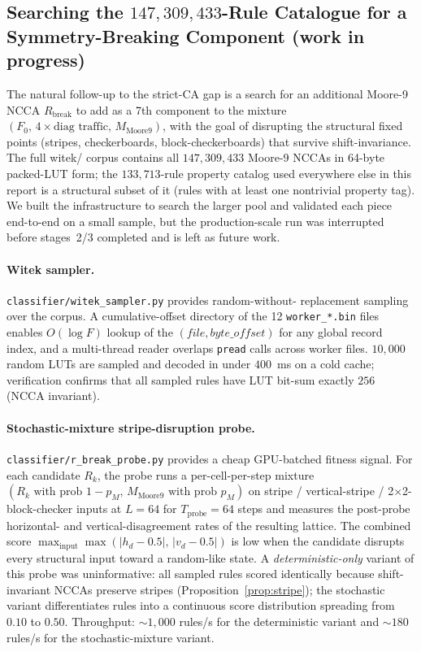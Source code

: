 \documentclass[11pt,a4paper]{article}
\newcommand{\fpath}[1]{\nolinkurl{#1}}
\begin{document}
\subsection{Searching the \(147{,}309{,}433\)-Rule Catalogue for a
            Symmetry-Breaking Component (work in progress)}
\label{subsec:r-break-search}

The natural follow-up to the strict-CA gap is a search for an
additional Moore-9 NCCA \(R_{\mathrm{break}}\) to add as a 7th
component to the mixture
\((F_0,\,4{\times}\text{diag traffic},\,M_{\mathrm{Moore9}})\), with
the goal of disrupting the structural fixed points (stripes,
checkerboards, block-checkerboards) that survive shift-invariance.
The full witek/ corpus contains all \(147{,}309{,}433\) Moore-9 NCCAs
in 64-byte packed-LUT form; the \(133{,}713\)-rule property catalog
used everywhere else in this report is a structural subset of it
(rules with at least one nontrivial property tag).  We built the
infrastructure to search the larger pool and validated each piece
end-to-end on a small sample, but the production-scale run was
interrupted before stages~2/3 completed and is left as future work.

\paragraph{Witek sampler.}
\fpath{classifier/witek_sampler.py} provides random-without-
replacement sampling over the corpus.  A cumulative-offset directory
of the 12 \texttt{worker\_*.bin} files enables \(O(\log F)\) lookup
of the \((file, byte\_offset)\) for any global record index, and a
multi-thread reader overlaps \texttt{pread} calls across worker files.
\(10{,}000\) random LUTs are sampled and decoded in under \(400\)~ms
on a cold cache; verification confirms that all sampled rules have LUT
bit-sum exactly \(256\) (NCCA invariant).

\paragraph{Stochastic-mixture stripe-disruption probe.}
\fpath{classifier/r_break_probe.py} provides a cheap GPU-batched
fitness signal.  For each candidate \(R_k\), the probe runs a
per-cell-per-step mixture
\((R_k\text{ with prob }1{-}p_M,\,M_{\mathrm{Moore9}}\text{ with prob }p_M)\)
on stripe / vertical-stripe / 2{$\times$}2-block-checker inputs at
\(L = 64\) for \(T_{\mathrm{probe}} = 64\) steps and measures the
post-probe horizontal- and vertical-disagreement rates of the
resulting lattice.  The combined score
\(\max_{\text{input}}\max(|h_d - 0.5|,\,|v_d - 0.5|)\) is low when the
candidate disrupts every structural input toward a random-like state.
A \emph{deterministic-only} variant of this probe was uninformative:
all sampled rules scored identically because shift-invariant NCCAs
preserve stripes (Proposition~\ref{prop:stripe}); the stochastic
variant differentiates rules into a continuous score distribution
spreading from \(0.10\) to \(0.50\).  Throughput: \(\sim 1{,}000\)
rules/s for the deterministic variant and \(\sim 180\) rules/s for
the stochastic-mixture variant.
\end{document}
